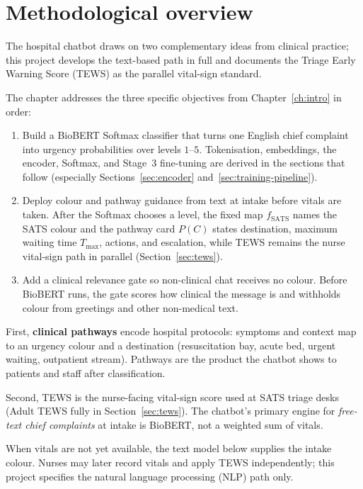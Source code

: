 \section{Methodological overview}
\label{sec:overview}

The hospital chatbot draws on two complementary ideas from clinical practice; this project develops the text-based path in full and documents the Triage Early Warning Score (TEWS) as the parallel vital-sign standard.

The chapter addresses the three specific objectives from Chapter~\ref{ch:intro} in order:
\begin{enumerate}
\item Build a BioBERT Softmax classifier that turns one English chief complaint into urgency probabilities over levels \(1\)--\(5\). Tokenisation, embeddings, the encoder, Softmax, and Stage~3 fine-tuning are derived in the sections that follow (especially Sections~\ref{sec:encoder} and~\ref{sec:training-pipeline}).
\item Deploy colour and pathway guidance from text at intake before vitals are taken. After the Softmax chooses a level, the fixed map \(f_{\mathrm{SATS}}\) names the SATS colour and the pathway card \(P(C)\) states destination, maximum waiting time \(T_{\max}\), actions, and escalation, while TEWS remains the nurse vital-sign path in parallel (Section~\ref{sec:tews}).
\item Add a clinical relevance gate so non-clinical chat receives no colour. Before BioBERT runs, the gate scores how clinical the message is and withholds colour from greetings and other non-medical text.
\end{enumerate}

First, \textbf{clinical pathways} encode hospital protocols: symptoms and context map to an urgency colour and a destination (resuscitation bay, acute bed, urgent waiting, outpatient stream). Pathways are the product the chatbot shows to patients and staff after classification.

Second, TEWS is the nurse-facing vital-sign score used at SATS triage desks (Adult TEWS fully in Section~\ref{sec:tews}). The chatbot's primary engine for \emph{free-text chief complaints} at intake is BioBERT, not a weighted sum of vitals.

When vitals are not yet available, the text model below supplies the intake colour. Nurses may later record vitals and apply TEWS independently; this project specifies the natural language processing (NLP) path only.

